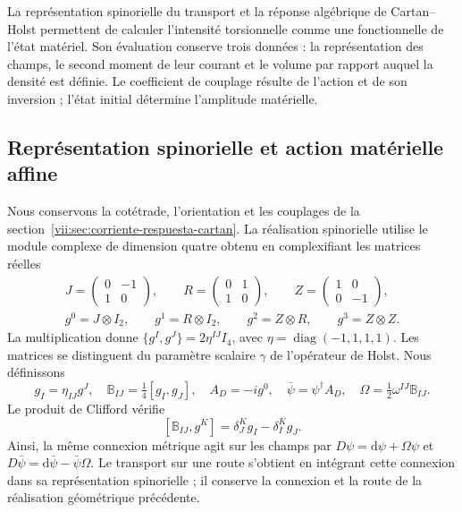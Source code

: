 La représentation spinorielle du transport et la réponse algébrique de Cartan--Holst permettent de calculer l'intensité torsionnelle comme une fonctionnelle de l'état matériel. Son évaluation conserve trois données : la représentation des champs, le second moment de leur courant et le volume par rapport auquel la densité est définie. Le coefficient de couplage résulte de l'action et de son inversion ; l'état initial détermine l'amplitude matérielle.

\subsection{Représentation spinorielle et action matérielle affine}
\label{vii:subsec:accion-espinorial-afin}

Nous conservons la cotétrade, l'orientation et les couplages de la
section~\ref{vii:sec:corriente-respuesta-cartan}. La réalisation
spinorielle utilise le module complexe de dimension quatre obtenu en
complexifiant les matrices réelles
\begin{equation}
 \begin{gathered}
 J=\begin{pmatrix}0&-1\\1&0\end{pmatrix},\qquad
 R=\begin{pmatrix}0&1\\1&0\end{pmatrix},\qquad
 Z=\begin{pmatrix}1&0\\0&-1\end{pmatrix},\\
 g^0=J\otimes I_2,\qquad g^1=R\otimes I_2,\qquad
 g^2=Z\otimes R,\qquad g^3=Z\otimes Z.
 \end{gathered}
 \label{vii:eq:clifford-material-explicito}
\end{equation}
La multiplication donne
\(\{g^I,g^J\}=2\eta^{IJ}I_4\), avec
\(\eta=\operatorname{diag}(-1,1,1,1)\). Les matrices se distinguent
du paramètre scalaire \(\gamma\) de l'opérateur de Holst. Nous définissons
\begin{equation}
 g_I=\eta_{IJ}g^J,\quad
 \mathbb B_{IJ}=\tfrac14[g_I,g_J],\quad
 A_D=-i g^0,\quad \bar\psi=\psi^\dagger A_D,\quad
 \Omega=\tfrac12\omega^{IJ}\mathbb B_{IJ}.
 \label{vii:eq:adjunto-conexion-espinorial}
\end{equation}
Le produit de Clifford vérifie
\[
 [\mathbb B_{IJ},g^K]=\delta_J^K g_I-\delta_I^K g_J.
\]
Ainsi, la même connexion métrique agit sur les champs par
\(D\psi=\mathrm d\psi+\Omega\psi\) et
\(D\bar\psi=\mathrm d\bar\psi-\bar\psi\Omega\).
Le transport sur une route s'obtient en intégrant cette connexion dans
sa représentation spinorielle ; il conserve la connexion et la route de la
réalisation géométrique précédente.

